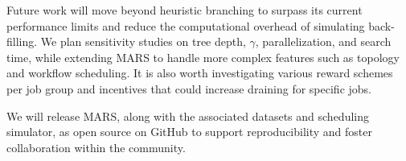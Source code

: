 \documentclass[conference]{IEEEtran}
\begin{document}

Future work will move beyond heuristic branching to surpass its current performance limits and reduce the computational overhead of simulating back-filling. We plan sensitivity studies on tree depth, $\gamma$, parallelization, and search time, while extending MARS to handle more complex features such as topology and workflow scheduling. It is also worth investigating various reward schemes per job group and incentives that could increase draining for specific jobs.

We will release MARS, along with the associated datasets and scheduling simulator, as open source on GitHub to support reproducibility and foster collaboration within the community.










%
%
%








\end{document}
